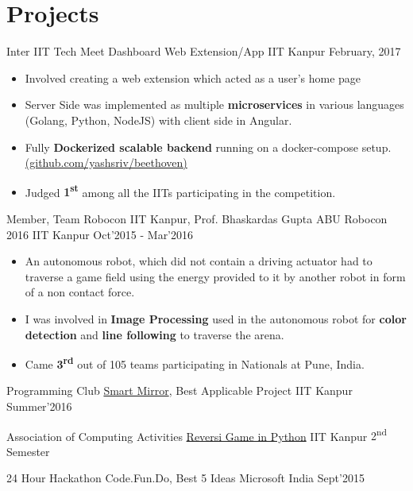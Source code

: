 \section*{Projects}

\cventry
{Inter IIT Tech Meet}
{Dashboard Web Extension/App}
{IIT Kanpur}
{February, 2017}
{
  \begin{itemize}
  \item Involved creating a web extension which acted as a user’s home page
  \item Server Side was implemented as multiple \textbf{microservices} in
    various languages (Golang, Python, NodeJS) with client side in Angular.
  \item Fully \textbf{Dockerized scalable backend} running on a docker-compose
    setup. \\
    \href{https://github.com/yashsriv/beethoven}{(github.com/yashsriv/beethoven)}
  \item Judged \textbf{1\textsuperscript{st}} among all the IITs participating
    in the competition.
  \end{itemize}
}

\cventry
{Member, Team Robocon IIT Kanpur, Prof. Bhaskardas Gupta}
{ABU Robocon 2016}
{IIT Kanpur}
{Oct'2015 - Mar'2016}
{
  \begin{itemize}
  \item An autonomous robot, which did not contain a driving actuator had to
    traverse a game field using the energy provided to it by another robot in
    form of a non contact force.
  \item I was involved in \textbf{Image Processing} used in the autonomous
    robot for \textbf{color detection} and \textbf{line following} to
    traverse the arena.
  \item Came \textbf{3\textsuperscript{rd}} out of 105 teams participating in Nationals at Pune, India.
  \end{itemize}
}

\smallcventry
{Programming Club}
{\href{http://pclub.in/project/2016/07/06/smartmirror.html}{Smart Mirror},}
{Best Applicable Project}
{IIT Kanpur}
{Summer'2016}

\smallcventry
{Association of Computing Activities}
{\href{http://github.com/yashsriv/Reversi-Python}{Reversi Game in Python}}
{}
{IIT Kanpur}
{2\textsuperscript{nd} Semester}

\smallcventry
{24 Hour Hackathon}
{Code.Fun.Do,}
{Best 5 Ideas}
{Microsoft India}
{Sept'2015}